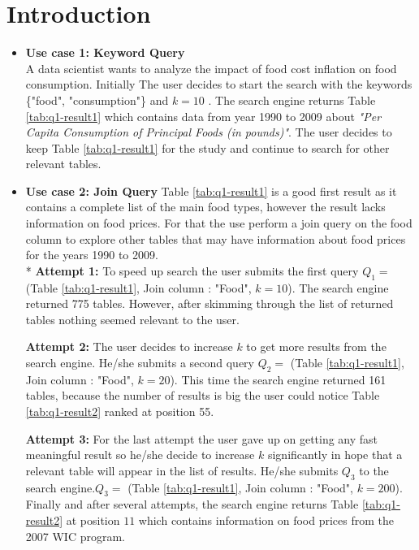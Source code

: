\section{Introduction}
\label{sec:introduction}

\begin{itemize}
	\item \textbf{Use case 1: Keyword Query}\\
	 A data scientist wants to analyze the impact of food cost inflation on food consumption. Initially  The user decides to start the search with the keywords \{"food", "consumption"\} and $k = 10$ . The search engine returns Table \ref{tab:q1-result1} which contains data from year 1990 to 2009 about {\it "Per Capita Consumption of Principal Foods (in pounds)"}. The user decides to keep Table \ref{tab:q1-result1} for the study and continue to search for other relevant tables. %
	
	\item \textbf{Use case 2: Join Query}
	Table \ref{tab:q1-result1} is a good first result as it contains a complete list of the main food types, however the result lacks information on food prices. For that the use perform a join query on the food column to explore other tables that may have information about food prices for the years 1990 to 2009. \\*
	\textbf{Attempt 1:} To speed up search the user submits the first query $Q_{1} =$ (Table \ref{tab:q1-result1}, Join column : "Food", $k = 10$). The search engine returned 775 tables. However, after skimming through the list of returned tables nothing seemed relevant to the user. 
	
	\textbf{Attempt 2:} The user decides to increase $k$ to get more results from the search engine. He/she submits a second query $Q_{2} =$ (Table \ref{tab:q1-result1}, Join column : "Food", $k = 20$). This time the search engine returned 161 tables, because the number of results is big the user could notice Table \ref{tab:q1-result2} ranked at position 55.
	
	\textbf{Attempt 3:} For the last attempt the user gave up on getting any fast meaningful result so he/she decide to increase $k$ significantly in hope that a relevant table will appear in the list of results. He/she submits $Q_{3}$ to the search engine.$Q_{3} =$ (Table \ref{tab:q1-result1}, Join column : "Food", $k = 200$). Finally and after several attempts, the search engine returns Table \ref{tab:q1-result2} at position $11$ which contains information on food prices from the 2007 WIC program. %


\end{itemize}
